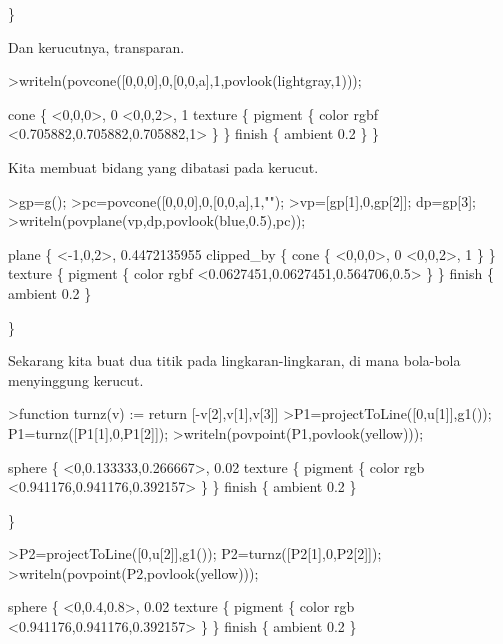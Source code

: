 \documentclass[a4paper,10pt]{article}
\begin{document}
\begin{eulernotebook}
\begin{eulercomment}
\begin{eulercomment}
\begin{eulercomment}
\begin{eulercomment}
\begin{eulercomment}
\begin{eulercomment}
\begin{eulercomment}
\begin{eulercomment}
\begin{eulercomment}
\begin{eulercomment}
\begin{eulercomment}
\begin{eulercomment}
\begin{eulercomment}
\begin{eulercomment}
\begin{eulercomment}
\begin{eulercomment}
\begin{euleroutput}
  \}
\end{euleroutput}
\begin{eulercomment}
Dan kerucutnya, transparan.
\end{eulercomment}
\begin{eulerprompt}
>writeln(povcone([0,0,0],0,[0,0,a],1,povlook(lightgray,1)));
\end{eulerprompt}
\begin{euleroutput}
  cone \{ <0,0,0>, 0 <0,0,2>, 1 texture \{ pigment \{ color rgbf <0.705882,0.705882,0.705882,1> \}  \} 
   finish \{ ambient 0.2 \} 
   \}
\end{euleroutput}
\begin{eulercomment}
Kita membuat bidang yang dibatasi pada kerucut.
\end{eulercomment}
\begin{eulerprompt}
>gp=g();
>pc=povcone([0,0,0],0,[0,0,a],1,"");
>vp=[gp[1],0,gp[2]]; dp=gp[3];
>writeln(povplane(vp,dp,povlook(blue,0.5),pc));
\end{eulerprompt}
\begin{euleroutput}
  plane \{ <-1,0,2>, 0.4472135955
  clipped_by \{ cone \{ <0,0,0>, 0 <0,0,2>, 1 \} \}  texture \{ pigment \{ color rgbf <0.0627451,0.0627451,0.564706,0.5> \}  \} 
   finish \{ ambient 0.2 \} 
  
  \}
\end{euleroutput}
\begin{eulercomment}
Sekarang kita buat dua titik pada lingkaran-lingkaran, di mana bola-bola menyinggung kerucut.
\end{eulercomment}
\begin{eulerprompt}
>function turnz(v) := return [-v[2],v[1],v[3]]
>P1=projectToLine([0,u[1]],g1()); P1=turnz([P1[1],0,P1[2]]);
>writeln(povpoint(P1,povlook(yellow)));
\end{eulerprompt}
\begin{euleroutput}
  sphere \{ <0,0.133333,0.266667>, 0.02 texture \{ pigment \{ color rgb <0.941176,0.941176,0.392157> \}  \} 
   finish \{ ambient 0.2 \} 
  
  \}
\end{euleroutput}
\begin{eulerprompt}
>P2=projectToLine([0,u[2]],g1()); P2=turnz([P2[1],0,P2[2]]);
>writeln(povpoint(P2,povlook(yellow)));
\end{eulerprompt}
\begin{euleroutput}
  sphere \{ <0,0.4,0.8>, 0.02 texture \{ pigment \{ color rgb <0.941176,0.941176,0.392157> \}  \} 
   finish \{ ambient 0.2 \} 
  

\end{euleroutput}
\end{eulercomment}
\end{eulercomment}
\end{eulercomment}
\end{eulercomment}
\end{eulercomment}
\end{eulercomment}
\end{eulercomment}
\end{eulercomment}
\end{eulercomment}
\end{eulercomment}
\end{eulercomment}
\end{eulercomment}
\end{eulercomment}
\end{eulercomment}
\end{eulercomment}
\end{eulercomment}
\end{eulernotebook}
\end{document}
